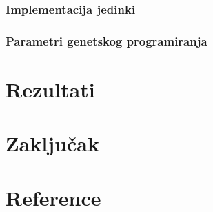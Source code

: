 \documentclass{article}
\begin{document}
\subsubsection{Implementacija jedinki}
\subsubsection{Parametri genetskog programiranja}

\section{Rezultati}
\section{Zaključak}
\section{Reference}
\end{document}
